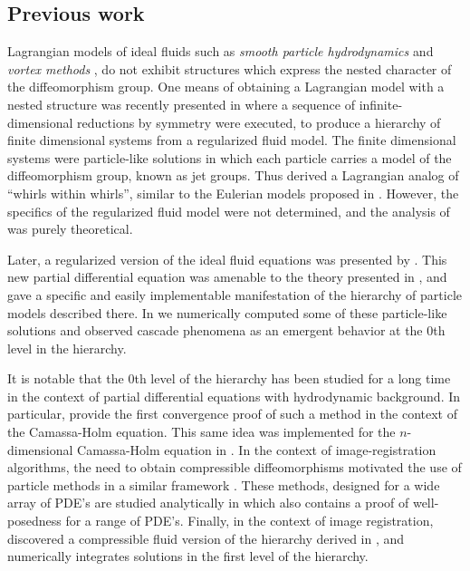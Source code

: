 \documentclass[12pt]{amsart}
\begin{document}
\subsection{Previous work}
  Lagrangian models of ideal fluids such as \emph{smooth particle hydrodynamics} \cite{Monaghan1977,Lucy1977} and
\emph{vortex methods} \cite{Chorin1973}, do not exhibit structures which express the nested character of the diffeomorphism group.
 One means of obtaining a Lagrangian model with a nested structure
 was recently presented in \cite{JacobsRatiuDesbrun2013}
 where a sequence of infinite-dimensional reductions by symmetry were
 executed, to produce a hierarchy of finite dimensional systems from a
 regularized fluid model.
 The finite dimensional systems were particle-like solutions
 in which each particle carries a model of the diffeomorphism group,
 known as jet groups.
 Thus \cite{JacobsRatiuDesbrun2013} derived a Lagrangian analog of 
 ``whirls within whirls'', similar to the Eulerian models proposed
 in \cite{HolmTronci2012}.
 However, the specifics of the regularized fluid model were not determined,
 and the analysis of \cite{JacobsRatiuDesbrun2013} was purely
 theoretical.
 
 Later, a regularized version of the ideal fluid equations was presented by
 \cite{MumfordMichor2013}.
 This new partial differential equation was amenable to the theory presented in 
 \cite{JacobsRatiuDesbrun2013}, and gave a specific and easily
 implementable manifestation of the hierarchy of particle models
 described there.
 In \cite{CotterHolmJacobsMeier2014} we numerically computed some
 of these particle-like solutions and observed cascade phenomena as
 an emergent behavior at the $0$th level in the hierarchy.

 It is notable that the $0$th level of the hierarchy has been studied
 for a long time in the context of partial differential equations with hydrodynamic background.
 In particular, \cite{HoldenRaynaud2006} provide the first convergence proof of such a method in the context of the Camassa-Holm equation.
 This same idea was implemented for the $n$-dimensional Camassa-Holm
 equation in \cite{ChertockDuToitMarsden2012}.
 In the context of image-registration algorithms, the need to obtain 
 compressible diffeomorphisms motivated the use of particle methods
 in a similar framework \cite{JoshiMiller2000}.
 These methods, designed for a wide array of PDE's are studied analytically
 in \cite{TrouveYounes2005} which also contains a proof of well-posedness
 for a range of PDE's.
 Finally, in the context of image registration, \cite{Sommer2013} 
 discovered a compressible fluid version of the hierarchy derived in \cite{JacobsRatiuDesbrun2013},
 and numerically integrates solutions in the first level of the hierarchy.
\end{document}
